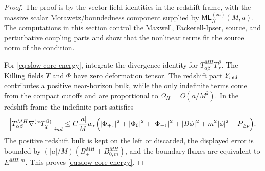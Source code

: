 \documentclass[10pt,a4paper]{amsart}
\newcommand{\ME}{\mathsf{ME}}
\begin{document}
\begin{proof}
The proof is by the vector-field identities in the redshift frame, with the massive scalar Morawetz/boundedness component supplied by \(\ME^{(m)}_N(M,a)\).  The computations in this section control the Maxwell, Fackerell-Ipser, source, and perturbative coupling parts and show that the nonlinear terms fit the source norm of the condition.

For \eqref{eq:slow-core-energy}, integrate the divergence identity for \(T^{MH}_{\alpha\beta}T_\chi^\beta\).  The Killing fields \(T\) and \(\Phi\) have zero deformation tensor.  The redshift part \(Y_{\rm red}\) contributes a positive near-horizon bulk, while the only indefinite terms come from the compact cutoffs and are proportional to \(\Omega_H=O(a/M^2)\).  In the redshift frame the indefinite part satisfies
\begin{equation}
\left|T^{MH}_{\alpha\beta}\nabla^{(\alpha}T_\chi^{\beta)}\right|_{\rm ind}
\le
C\frac{|a|}{M}w_r
\Bigl(|\Phi_{+1}|^2+|\Phi_0|^2+|\Phi_{-1}|^2+|D\phi|^2+m^2|\phi|^2+P_{\ge p}\Bigr).
\end{equation}
The positive redshift bulk is kept on the left or discarded, the displayed error is bounded by \((|a|/M)(B_{\pm}^{MH}+B_{0,m}^{MH})\), and the boundary fluxes are equivalent to \(E^{MH,m}\).  This proves \eqref{eq:slow-core-energy}.


\end{proof}
\end{document}

